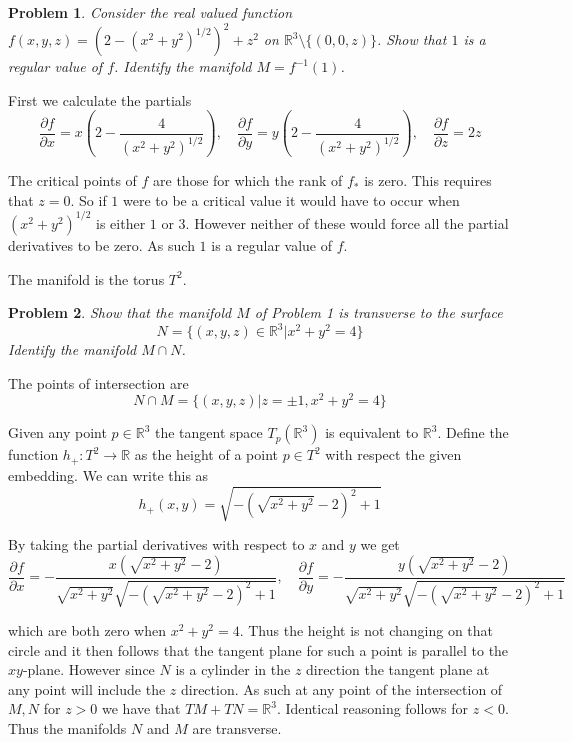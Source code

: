 \documentclass[10pt]{article}
\newcommand{\sk}{\vskip10mm}
\newcommand{\bb}[1]{\mathbb{#1}}
\theoremstyle{plain}
\newtheorem{problem}{Problem}
\theoremstyle{remark}
\begin{document}
\begin{problem}
  Consider the real valued function $f(x,y,z)=(2-(x^2+y^2)^{1/2})^2+z^2$
  on $\bb{R}^3\setminus\{(0,0,z)\}$. Show that $1$ is a regular value of $f$.
  Identify the manifold $M=f^{-1}(1)$.
\end{problem}

First we calculate the partials
\[
  \frac{\partial f}{\partial x}=x\left(2-\frac{4}{(x^2+y^2)^{1/2}}\right) ,
  \quad\frac{\partial f}{\partial y}=y\left(2-\frac{4}{(x^2+y^2)^{1/2}}\right) ,
  \quad\frac{\partial f}{\partial z}= 2z 
\]

The critical points of $f$ are those for which the rank of $f_*$ is zero. This
requires that $z=0$. So if $1$ were to be a critical value it would have
to occur when $(x^2+y^2)^{1/2}$ is either $1$ or $3$. However neither of these would
force all the partial derivatives to be zero. As such $1$ is a regular value of $f$.

The manifold is the torus $T^2$.

\sk

\begin{problem}
  Show that the manifold $M$ of Problem 1 is transverse to the surface
  \[
    N=\{(x,y,z)\in\bb{R}^3|x^2+y^2=4\}
  \]
  Identify the manifold $M\cap N$.
\end{problem}

The points of intersection are
\[
  N\cap M = \{(x,y,z)|z=\pm 1, x^2+y^2=4\}
\]

Given any point $p\in\bb{R}^3$ the tangent space $T_p(\bb{R}^3)$ is equivalent
to $\bb{R}^3$. Define the function $h_+:T^2\rightarrow\bb{R}$ as the height of a point
$p\in T^2$ with respect the given embedding. We can write this as
\[
  h_+(x,y)= \sqrt{-{\left(\sqrt{x^{2} + y^{2}} - 2\right)}^{2} + 1}
\]

By taking the partial derivatives with respect to $x$ and $y$ we get
\[
\frac{\partial f}{\partial x} = -\frac{x {\left(\sqrt{x^{2} + y^{2}} - 2\right)}}{\sqrt{x^{2} + y^{2}} \sqrt{-{\left(\sqrt{x^{2} + y^{2}} - 2\right)}^{2} + 1}},\quad \frac{\partial f}{\partial y}=-\frac{y {\left(\sqrt{x^{2} + y^{2}} - 2\right)}}{\sqrt{x^{2} + y^{2}} \sqrt{-{\left(\sqrt{x^{2} + y^{2}} - 2\right)}^{2} + 1}}
\]

which are both zero when $x^2+y^2=4$. Thus the height is not changing on that circle and
it then follows that the tangent plane for such a point is parallel to the $xy$-plane. However
since $N$ is a cylinder in the $z$ direction the tangent plane at any point will include
the $z$ direction. As such at any point of the intersection of $M,N$ for $z>0$ we have
that $TM+TN=\bb{R}^3$. Identical reasoning follows for $z<0$. Thus the manifolds
$N$ and $M$ are transverse.
\end{document}
